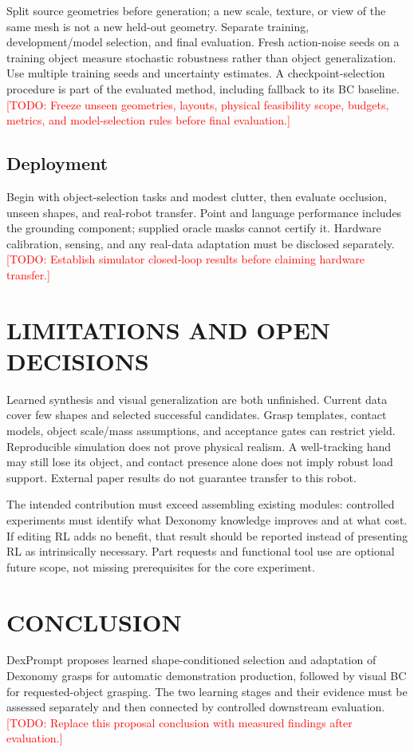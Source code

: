\documentclass[letterpaper, 10 pt, conference]{ieeeconf}
\newcommand{\todo}[1]{\textcolor{red}{[TODO: #1]}}
\begin{document}
Split source geometries before generation; a new scale, texture, or view of the
same mesh is not a new held-out geometry. Separate training, development/model
selection, and final evaluation. Fresh action-noise seeds on a training object
measure stochastic robustness rather than object generalization. Use multiple
training seeds and uncertainty estimates. A checkpoint-selection procedure is
part of the evaluated method, including fallback to its BC baseline.
\todo{Freeze unseen geometries, layouts, physical feasibility scope, budgets,
metrics, and model-selection rules before final evaluation.}

\subsection{Deployment}
Begin with object-selection tasks and modest clutter, then evaluate occlusion,
unseen shapes, and real-robot transfer. Point and language performance includes
the grounding component; supplied oracle masks cannot certify it. Hardware
calibration, sensing, and any real-data adaptation must be disclosed separately.
\todo{Establish simulator closed-loop results before claiming hardware transfer.}

\section{LIMITATIONS AND OPEN DECISIONS}
Learned synthesis and visual generalization are both unfinished. Current data
cover few shapes and selected successful candidates. Grasp templates, contact
models, object scale/mass assumptions, and acceptance gates can restrict yield.
Reproducible simulation does not prove physical realism. A well-tracking hand
may still lose its object, and contact presence alone does not imply robust
load support. External paper results do not guarantee transfer to this robot.

The intended contribution must exceed assembling existing modules: controlled
experiments must identify what Dexonomy knowledge improves and at what cost.
If editing RL adds no benefit, that result should be reported instead of
presenting RL as intrinsically necessary. Part requests and functional tool use
are optional future scope, not missing prerequisites for the core experiment.

\section{CONCLUSION}
DexPrompt proposes learned shape-conditioned selection and adaptation of
Dexonomy grasps for automatic demonstration production, followed by visual BC
for requested-object grasping. The two learning stages and their evidence must
be assessed separately and then connected by controlled downstream evaluation.
\todo{Replace this proposal conclusion with measured findings after evaluation.}
\end{document}
